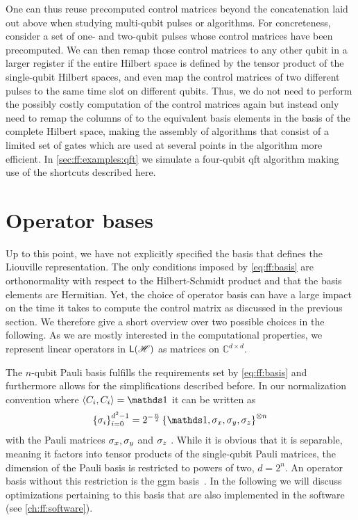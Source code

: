 One can thus reuse precomputed control matrices beyond the concatenation laid out above when studying multi-qubit pulses or algorithms.
For concreteness, consider a set of one- and two-qubit pulses whose control matrices have been precomputed.
We can then remap those control matrices to any other qubit in a larger register if the entire Hilbert space is defined by the tensor product of the single-qubit Hilbert spaces, and even map the control matrices of two different pulses to the same time slot on different qubits.
Thus, we do not need to perform the possibly costly computation of the control matrices again but instead only need to remap the columns of \ctrlmat to the equivalent basis elements in the basis of the complete Hilbert space, making the assembly of algorithms that consist of a limited set of gates which are used at several points in the algorithm more efficient.
In \cref{sec:ff:examples:qft} we simulate a four-qubit \gls{qft} algorithm making use of the shortcuts described here.

\section{Operator bases}\label{sec:ff:performance:basis}
Up to this point, we have not explicitly specified the basis that defines the Liouville representation.
The only conditions imposed by \cref{eq:ff:basis} are orthonormality with respect to the Hilbert-Schmidt product and that the basis elements are Hermitian.
Yet, the choice of operator basis can have a large impact on the time it takes to compute the control matrix as discussed in the previous section.
We therefore give a short overview over two possible choices in the following.
As we are mostly interested in the computational properties, we represent linear operators in $\mathsf{L}(\mathscr{H})$ as matrices on $\mathbb{C}^{d\times d}$.

The $n$-qubit Pauli basis fulfills the requirements set by \cref{eq:ff:basis} and furthermore allows for the simplifications described before.
In our normalization convention where $\dotHS{C_i}{C_i} = \eye$ it can be written as
\begin{equation}\label{eq:ff:basis:pauli}
\left\lbrace\sigma_i\right\rbrace_{i=0}^{d^2-1} = 2^{-\frac{n}{2}}\left\lbrace \eye, \sx, \sy, \sz \right\rbrace^{\otimes n}
\end{equation}
with the Pauli matrices $\sigma_x,\sigma_y$ and $\sigma_z$ .
While it is obvious that it is separable, meaning it factors into tensor products of the single-qubit Pauli matrices, the dimension of the Pauli basis is restricted to powers of two, \ie $d = 2^n$.
An operator basis without this restriction is the \gls{ggm} basis~\cite{Kimura2003,Bertlmann2008}.
In the following we will discuss optimizations pertaining to this basis that are also implemented in the software (see \cref{ch:ff:software}).

